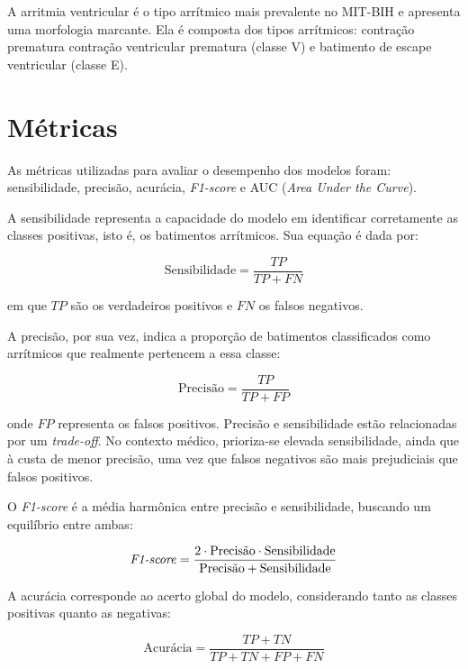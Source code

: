 A arritmia ventricular é o tipo arrítmico mais prevalente no MIT-BIH e apresenta uma morfologia marcante. Ela é composta dos tipos arrítmicos: contração prematura
contração ventricular prematura (classe V) e batimento de escape ventricular (classe E).


\section{Métricas}
\label{sec:metricas}

As métricas utilizadas para avaliar o desempenho dos modelos foram: sensibilidade, precisão, acurácia, \textit{F1-score} e AUC (\textit{Area Under the Curve}).  

A sensibilidade representa a capacidade do modelo em identificar corretamente as classes positivas, isto é, os batimentos arrítmicos. Sua equação é dada por:

\begin{equation}
\text{Sensibilidade} = \frac{TP}{TP + FN}
\end{equation}

em que $TP$ são os verdadeiros positivos e $FN$ os falsos negativos.  

A precisão, por sua vez, indica a proporção de batimentos classificados como arrítmicos que realmente pertencem a essa classe:

\begin{equation}
\text{Precisão} = \frac{TP}{TP + FP}
\end{equation}

onde $FP$ representa os falsos positivos. Precisão e sensibilidade estão relacionadas por um \textit{trade-off}. No contexto médico, prioriza-se elevada sensibilidade, ainda que à custa de menor precisão, uma vez que falsos negativos são mais prejudiciais que falsos positivos.  

O \textit{F1-score} é a média harmônica entre precisão e sensibilidade, buscando um equilíbrio entre ambas:

\begin{equation}
\text{\textit{F1-score}} = \frac{2 \cdot \text{Precisão} \cdot \text{Sensibilidade}}{\text{Precisão} + \text{Sensibilidade}}
\end{equation}

A acurácia corresponde ao acerto global do modelo, considerando tanto as classes positivas quanto as negativas:

\begin{equation}
\text{Acurácia} = \frac{TP + TN}{TP + TN + FP + FN}
\end{equation}

